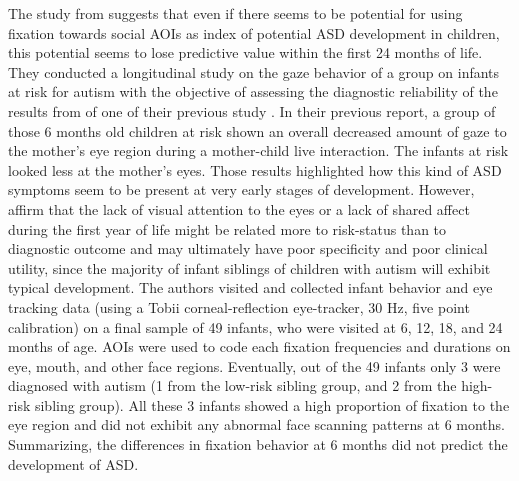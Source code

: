 The study from \cite{young2009gazechildren} suggests that even if there seems to be potential for using fixation towards social AOIs as index of potential ASD development in children, this potential seems to lose predictive value within the first 24 months of life. They conducted a longitudinal study on the gaze behavior of a group on infants at risk for autism with the objective of assessing the diagnostic reliability of the results from of one of their previous study \citep{merin2007fixation}. In their previous report, a group of those 6 months old children at risk shown an overall decreased amount of gaze to the mother’s eye region during a mother-child live interaction. The infants at risk looked less at the mother’s eyes. Those results highlighted how this kind of ASD symptoms seem to be present at very early stages of development. However, \cite{young2009gazechildren} affirm that the lack of visual attention to the eyes or a lack of shared affect during the first year of life might be related more to risk-status than to diagnostic outcome and may ultimately have poor specificity and poor clinical utility, since the majority of infant siblings of children with autism will exhibit typical development. The authors visited and collected infant behavior and eye tracking data (using a Tobii corneal-reflection eye-tracker, 30 Hz, five point calibration) on a final sample of 49 infants, who were visited at 6, 12, 18, and 24 months of age. AOIs were used to code each fixation frequencies and durations on eye, mouth, and other face regions. Eventually, out of the 49 infants only 3 were diagnosed with autism (1 from the low-risk sibling group, and 2 from the high-risk sibling group). All these 3 infants showed a high proportion of fixation to the eye region and did not exhibit any abnormal face scanning patterns at 6 months. Summarizing, the differences in fixation behavior at 6 months did not predict the development of ASD. 


